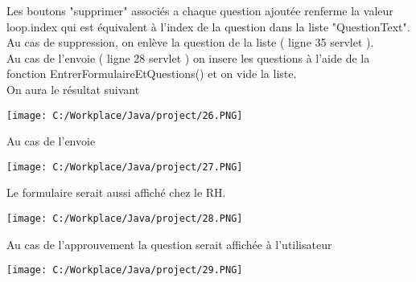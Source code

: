 \documentclass[12]{article}
\begin{document}
Les boutons "supprimer" associés a chaque question ajoutée renferme la valeur loop.index qui est équivalent à l'index de la question dans la liste "QuestionText". Au cas de suppression, on enlève la question de la liste ( ligne 35 servlet ).\\

Au cas de l'envoie ( ligne 28 servlet ) on insere les questions à l'aide de la fonction EntrerFormulaireEtQuestions() et on vide la liste.\\



On aura le résultat suivant 




\begin{center}
\texttt{[image: C:/Workplace/Java/project/26.PNG]}
\end{center}


Au cas de l'envoie 


\begin{center}
\texttt{[image: C:/Workplace/Java/project/27.PNG]}
\end{center}

Le formulaire serait aussi affiché chez le RH.



\begin{center}
\texttt{[image: C:/Workplace/Java/project/28.PNG]}
\end{center}


Au cas de l'approuvement la question serait affichée à l'utilisateur



\begin{center}
\texttt{[image: C:/Workplace/Java/project/29.PNG]}
\end{center}
\end{document}
